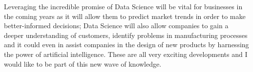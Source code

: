 \documentclass[11pt, a4paper]{awesome-cv}
\begin{document}
\begin{cvletter}
Leveraging the incredible promise of Data Science will be vital for businesses in the coming years as it will allow them to predict market trends in order to make better-informed decisions; Data Science will also allow companies to gain a deeper understanding of customers, identify problems in manufacturing processes and it could even in assist companies in the design of new products by harnessing the power of artificial intelligence. These are all very exciting developments and I would like to be part of this new wave of knowledge. 

\end{cvletter}

\makeletterclosing
\end{document}
